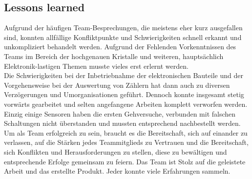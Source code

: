\clearpage
\subsection{Lessons learned}
	Aufgrund der häufigen Team-Besprechungen, die meistens eher kurz ausgefallen sind, konnten allfällige Konfliktpunkte und Schwierigkeiten schnell erkannt und unkompliziert behandelt werden. Aufgrund der Fehlenden Vorkenntnissen des Teams im Bereich der hochgenauen Kristalle und weiteren, hauptsächlich Elektronik-lastigen Themen musste vieles erst erlernt werden.\\
	Die Schwierigkeiten bei der Inbetriebnahme der elektronischen Bauteile und der Vorgehensweise bei der Auswertung von Zählern hat dann auch zu diversen Verzögerungen und Umorganisationen geführt. Dennoch konnte insgesamt stetig vorwärts gearbeitet und selten angefangene Arbeiten komplett verworfen werden. Einzig einige Sensoren haben die ersten Gehversuche, verbunden mit falschen Schaltungen nicht überstanden und mussten entsprechend nachbestellt werden.\\
	Um als Team erfolgreich zu sein, braucht es die Bereitschaft, sich auf einander zu verlassen, auf die Stärken jedes Teammitglieds zu Vertrauen und die Bereitschaft, sich Konflikten und Herausforderungen zu stellen, diese zu bewältigen und entsprechende Erfolge gemeinsam zu feiern.
	Das Team ist Stolz auf die geleistete Arbeit und das erstellte Produkt. Jeder konnte viele Erfahrungen sammeln.
		